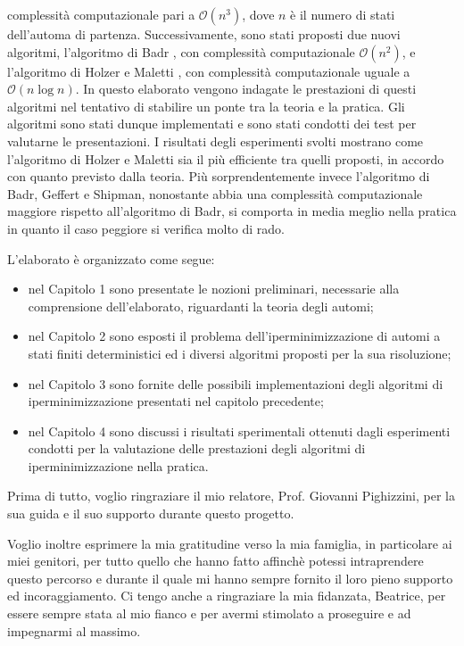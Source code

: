 \documentclass[a4paper,12pt]{report} %
\newcommand{\bigo}[0]{\mathcal{O}}            %
\begin{document}
complessità computazionale pari a $\bigo(n^3)$, dove $n$ è il numero di stati dell'automa di partenza.
Successivamente, sono stati proposti due nuovi algoritmi, l'algoritmo di Badr \parencite{Badr}, con complessità
computazionale $\bigo(n^2)$, e l'algoritmo di Holzer e Maletti \parencite{HM10}, con complessità computazionale 
uguale a $\bigo(n \log n)$. In questo elaborato vengono indagate le prestazioni di questi
algoritmi nel tentativo di stabilire un ponte tra la teoria e la pratica. Gli algoritmi sono stati
dunque implementati e sono stati condotti dei test per valutarne le presentazioni.
I risultati degli esperimenti svolti mostrano come l'algoritmo di Holzer e Maletti sia il più efficiente tra quelli proposti, 
in accordo con quanto previsto dalla teoria. Più sorprendentemente invece l'algoritmo di Badr, Geffert e Shipman, 
nonostante abbia una complessità computazionale maggiore rispetto all'algoritmo di Badr, 
si comporta in media meglio nella pratica in quanto il caso peggiore si verifica molto di rado.

L'elaborato è organizzato come segue:
\begin{itemize}
  \item nel Capitolo 1 sono presentate le nozioni preliminari, necessarie alla comprensione dell'elaborato,
  riguardanti la teoria degli automi;
  \item nel Capitolo 2 sono esposti il problema dell'iperminimizzazione di automi a stati finiti deterministici
  ed i diversi algoritmi proposti per la sua risoluzione;
  \item nel Capitolo 3 sono fornite delle possibili implementazioni degli algoritmi di iperminimizzazione
  presentati nel capitolo precedente;
  \item nel Capitolo 4 sono discussi i risultati sperimentali ottenuti dagli esperimenti condotti per la valutazione
  delle prestazioni degli algoritmi di iperminimizzazione nella pratica.
\end{itemize}



Prima di tutto, voglio ringraziare il mio relatore, Prof. Giovanni Pighizzini,
per la sua guida e il suo supporto durante questo progetto.

Voglio inoltre esprimere la mia gratitudine verso la mia famiglia, in particolare ai miei genitori, per 
tutto quello che hanno fatto affinchè potessi intraprendere questo percorso e durante 
il quale mi hanno sempre fornito il loro pieno supporto ed incoraggiamento.
Ci tengo anche a ringraziare la mia fidanzata, Beatrice, per essere sempre stata al mio fianco
e per avermi stimolato a proseguire e ad impegnarmi al massimo.
\end{document}
